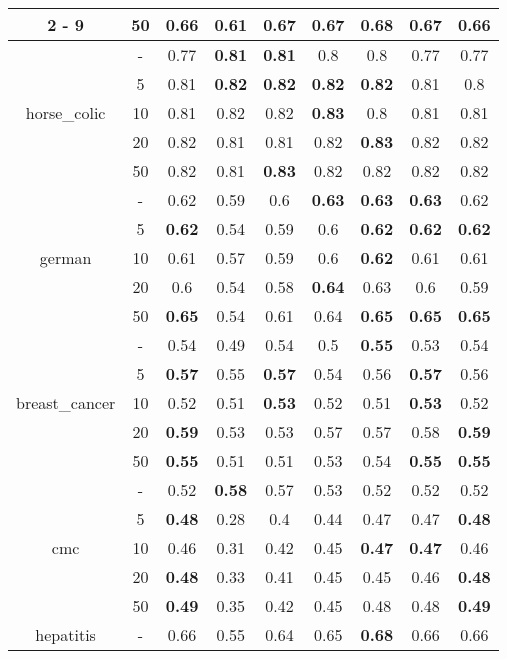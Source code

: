 \documentclass{article}%
\begin{document}
\begin{longtable}{c|c|ccccccc}
\cline{2%
-%
9}%
&50&0.66&0.61&0.67&0.67&\textbf{0.68}&0.67&0.66\\%
\hline%
\multirow{5}{*}{horse\_colic}&{-}&0.77&\textbf{0.81}&\textbf{0.81}&0.8&0.8&0.77&0.77\\%
\cline{2%
-%
9}%
&5&0.81&\textbf{0.82}&\textbf{0.82}&\textbf{0.82}&\textbf{0.82}&0.81&0.8\\%
\cline{2%
-%
9}%
&10&0.81&0.82&0.82&\textbf{0.83}&0.8&0.81&0.81\\%
\cline{2%
-%
9}%
&20&0.82&0.81&0.81&0.82&\textbf{0.83}&0.82&0.82\\%
\cline{2%
-%
9}%
&50&0.82&0.81&\textbf{0.83}&0.82&0.82&0.82&0.82\\%
\hline%
\multirow{5}{*}{german}&{-}&0.62&0.59&0.6&\textbf{0.63}&\textbf{0.63}&\textbf{0.63}&0.62\\%
\cline{2%
-%
9}%
&5&\textbf{0.62}&0.54&0.59&0.6&\textbf{0.62}&\textbf{0.62}&\textbf{0.62}\\%
\cline{2%
-%
9}%
&10&0.61&0.57&0.59&0.6&\textbf{0.62}&0.61&0.61\\%
\cline{2%
-%
9}%
&20&0.6&0.54&0.58&\textbf{0.64}&0.63&0.6&0.59\\%
\cline{2%
-%
9}%
&50&\textbf{0.65}&0.54&0.61&0.64&\textbf{0.65}&\textbf{0.65}&\textbf{0.65}\\%
\hline%
\multirow{5}{*}{breast\_cancer}&{-}&0.54&0.49&0.54&0.5&\textbf{0.55}&0.53&0.54\\%
\cline{2%
-%
9}%
&5&\textbf{0.57}&0.55&\textbf{0.57}&0.54&0.56&\textbf{0.57}&0.56\\%
\cline{2%
-%
9}%
&10&0.52&0.51&\textbf{0.53}&0.52&0.51&\textbf{0.53}&0.52\\%
\cline{2%
-%
9}%
&20&\textbf{0.59}&0.53&0.53&0.57&0.57&0.58&\textbf{0.59}\\%
\cline{2%
-%
9}%
&50&\textbf{0.55}&0.51&0.51&0.53&0.54&\textbf{0.55}&\textbf{0.55}\\%
\hline%
\multirow{5}{*}{cmc}&{-}&0.52&\textbf{0.58}&0.57&0.53&0.52&0.52&0.52\\%
\cline{2%
-%
9}%
&5&\textbf{0.48}&0.28&0.4&0.44&0.47&0.47&\textbf{0.48}\\%
\cline{2%
-%
9}%
&10&0.46&0.31&0.42&0.45&\textbf{0.47}&\textbf{0.47}&0.46\\%
\cline{2%
-%
9}%
&20&\textbf{0.48}&0.33&0.41&0.45&0.45&0.46&\textbf{0.48}\\%
\cline{2%
-%
9}%
&50&\textbf{0.49}&0.35&0.42&0.45&0.48&0.48&\textbf{0.49}\\%
\hline%
\multirow{5}{*}{hepatitis}&{-}&0.66&0.55&0.64&0.65&\textbf{0.68}&0.66&0.66\\%

\end{longtable}
\end{document}
